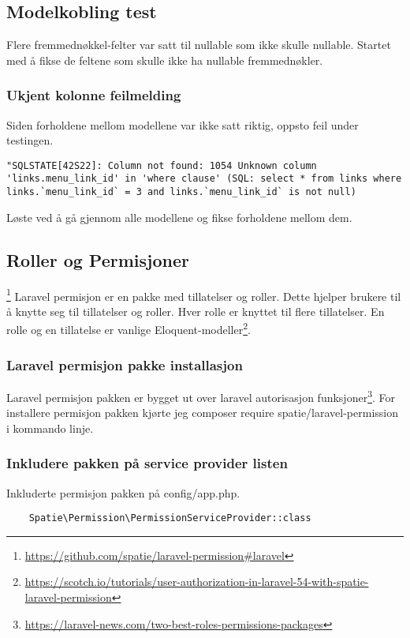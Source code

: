 \subsection{Modelkobling test}
Flere fremmednøkkel-felter var satt til nullable som ikke skulle nullable. Startet med å fikse de feltene som skulle ikke ha nullable fremmednøkler.

\subsubsection{Ukjent kolonne feilmelding}
Siden forholdene mellom modellene var ikke satt riktig, oppsto feil under testingen.
\begin{lstlisting}
"SQLSTATE[42S22]: Column not found: 1054 Unknown column 'links.menu_link_id' in 'where clause' (SQL: select * from links where links.`menu_link_id` = 3 and links.`menu_link_id` is not null) 
\end{lstlisting}
Løste ved å gå gjennom alle modellene og fikse forholdene mellom dem.

\subsection{Roller og Permisjoner}\footnote{\url{https://github.com/spatie/laravel-permission#laravel}}
Laravel permisjon er en pakke med tillatelser og roller. Dette hjelper brukere til å knytte seg til tillatelser og roller. Hver rolle er knyttet til flere tillatelser. En rolle og en tillatelse er vanlige Eloquent-modeller\footnote{\url{https://scotch.io/tutorials/user-authorization-in-laravel-54-with-spatie-laravel-permission}}.
\subsubsection{Laravel permisjon pakke installasjon} 
Laravel permisjon pakken er bygget ut over laravel autorisasjon funksjoner\footnote{\url{https://laravel-news.com/two-best-roles-permissions-packages}}.
For installere permisjon pakken kjørte jeg composer require spatie/laravel-permission i kommando linje.

\subsubsection{Inkludere pakken på service provider listen}
Inkluderte permisjon pakken på config/app.php. 
\begin{lstlisting}
    Spatie\Permission\PermissionServiceProvider::class
\end{lstlisting}

